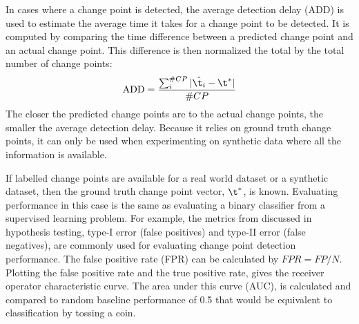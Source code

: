 



In cases where a change point is detected, the average detection delay (ADD) is used to estimate the average time it takes for a change point to be detected. It is computed by comparing the time difference between a predicted change point and an actual change point. This difference is then normalized the total by the total number of change points:
\begin{equation}
\text{ADD} = \frac{\sum_i^{\#CP} |\hat{\t_i} - \t^*|}{\#CP}
\end{equation}
The closer the predicted change points are to the actual change points, the smaller the average detection delay. Because it relies on ground truth change points, it can only be used when experimenting on synthetic data where all the information is available.%

If labelled change points are available for a real world dataset or a synthetic dataset, then the ground truth change point vector, $\t^*$, is known. Evaluating performance in this case is the same as evaluating a binary classifier from a supervised learning problem. For example, the metrics from discussed in hypothesis testing, type-I error (false positives) and type-II error (false negatives), are commonly used for evaluating change point detection performance. The false positive rate (FPR) can be calculated by $FPR = FP / N$. Plotting the false positive rate and the true positive rate, gives the receiver operator characteristic curve. The area under this curve (AUC), is calculated and compared to random baseline performance of 0.5 that would be equivalent to classification by tossing a coin.

